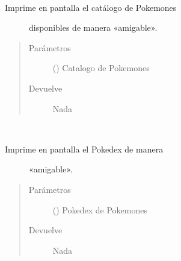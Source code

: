 \documentclass[letterpaper,10pt,spanish,openany,oneside]{sphinxmanual}
\begin{document}
\begin{fulllineitems}
\label{\detokenize{pokemonClient:pokemonClient.displayCatalogo}}~\begin{description}
\item[{Imprime en pantalla el catálogo de Pokemones}] \leavevmode
disponibles de manera «amigable».

\end{description}
\begin{quote}\begin{description}
\item[{Parámetros}] \leavevmode
{} () \textendash{} Catalogo de Pokemones

\item[{Devuelve}] \leavevmode
Nada

\end{description}\end{quote}

\end{fulllineitems}


\begin{fulllineitems}
\label{\detokenize{pokemonClient:pokemonClient.displayPokedex}}~\begin{description}
\item[{Imprime en pantalla el Pokedex de manera}] \leavevmode
«amigable».

\end{description}
\begin{quote}\begin{description}
\item[{Parámetros}] \leavevmode
{} () \textendash{} Pokedex de Pokemones

\item[{Devuelve}] \leavevmode
Nada

\end{description}\end{quote}

\end{fulllineitems}
\end{document}
